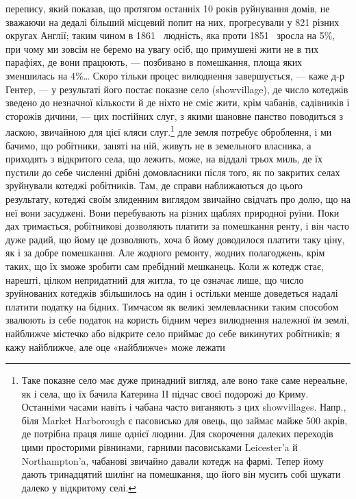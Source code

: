 перепису, який показав, що протягом останніх 10 років руйнування
домів, не зважаючи на дедалі більший місцевий попит на
них, проґресували у 821 різних округах Англії; таким чином в
1861~ людність, яка проти 1851~ зросла на 5\%, при чому
ми зовсім не беремо на увагу осіб, що примушені жити не в тих
парафіях, де вони працюють, — позбивано в помешкання, площа
яких зменшилась на 4\%\dots{} Скоро тільки процес вилюднення
завершується, — каже д-р Гентер, — у результаті його постає
показне село (showvillage), де число котеджів зведено до незначної
кількости й де ніхто не сміє жити, крім чабанів, садівників
і сторожів дичини, — цих постійних слуг, з якими шановне панство
поводиться з ласкою, звичайною для цієї кляси слуг.\footnote{
Таке показне село має дуже принадний вигляд, але воно таке
саме нереальне, як і села, що їх бачила Катерина II підчас своєї подорожі
до Криму. Останніми часами навіть і чабана часто виганяють з цих showvillages.
Напр., біля Market Harborough є пасовисько для овець, що
займає майже 500 акрів, де потрібна праця лише однієї людини. Для скорочення
далеких переходів цими просторими рівнинами, гарними пасовиськами
Leicester’a й Northampton’a, чабанові звичайно давали котедж
на фармі. Тепер йому дають тринадцятий шилінґ на помешкання, що його
він мусить собі шукати далеко у відкритому селі.
}
дле земля потребує оброблення, і ми бачимо, що робітники,
заняті на ній, живуть не в земельного власника, а приходять з
відкритого села, що лежить, може, на віддалі трьох миль, де
їх пустили до себе численні дрібні домовласники після того, як
по закритих селах зруйнували котеджі робітників. Там, де справи
наближаються до цього результату, котеджі своїм злиденним
виглядом звичайно свідчать про долю, що на неї вони засуджені.
Вони перебувають на різних щаблях природної руїни. Поки
дах тримається, робітникові дозволяють платити за помешкання
ренту, і він часто дуже радий, що йому це дозволяють, хоча б
йому доводилося платити таку ціну, як і за добре помешкання.
Але жодного ремонту, жодних полагоджень, крім таких, що їх
зможе зробити сам пребідний мешканець. Коли ж котедж стає,
нарешті, цілком непридатний для житла, то це означає лише,
що число зруйнованих котеджів збільшилось на один і остільки
менше доведеться надалі платити податку на бідних. Тимчасом
як великі землевласники таким способом звалюють із себе податок
на користь бідним через вилюднення належної їм землі, найближче
містечко або відкрите село приймає до себе викинутих
робітників; я кажу найближче, але оце «найближче» може лежати
